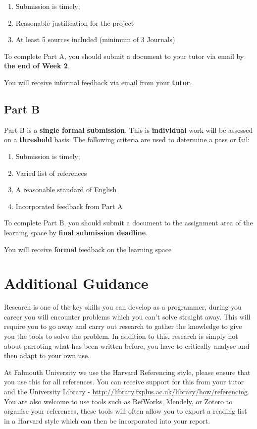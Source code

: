 \documentclass{../../fal_assignment}
\begin{document}
\begin{enumerate}[label=(\alph*)]
	\item Submission is timely;
	\item Reasonable justification for the project
	\item At least 5 sources included (minimum of 3 Journals)
\end{enumerate}

To complete Part A, you should submit a document to your tutor via email by \textbf{the end of Week 2}.

You will receive informal feedback via email from your \textbf{tutor}.

\subsection*{Part B}

Part B is a \textbf{single formal submission}. This is \textbf{individual} work will be assessed on a \textbf{threshold} basis. The following criteria are used to determine a pass or fail: 

\begin{enumerate}[label=(\alph*)]
	\item Submission is timely;
	\item Varied list of references
	\item A reasonable standard of English
	\item Incorporated feedback from Part A
\end{enumerate}

To complete Part B, you should submit a document to the assignment area of the learning space by \textbf{final submission deadline}.

You will receive \textbf{formal} feedback on the learning space

\section*{Additional Guidance}
Research is one of the key skills you can develop as a programmer, during you career you will encounter problems which you can't solve straight away. This will require you to go away and carry out research to gather the knowledge to give you the tools to solve the problem. In addition to this, research is simply not about parroting what has been written before, you have to critically analyse and then adapt to your own use.

At Falmouth University we use the Harvard Referencing style, please ensure that you use this  for all references. You can receive support for this from your tutor and the University Library - \url{http://library.fxplus.ac.uk/library/how/referencing}. You are also welcome to use tools such as RefWorks, Mendely, or Zotero to organise your references, these tools will often allow you to export a reading list in a Harvard style which can then be incorporated into your report.
\end{document}
